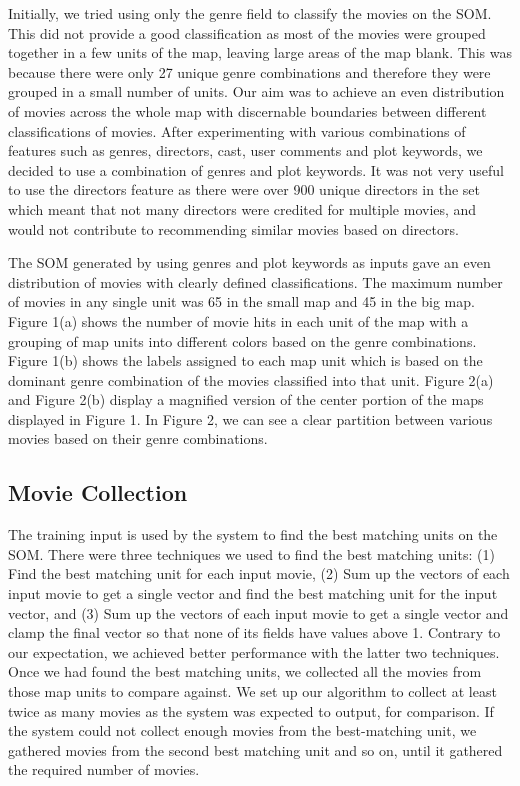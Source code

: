 \documentclass[conference]{IEEEtran}
\begin{document}
Initially, we tried using only the genre field to classify the movies on the SOM. This did not provide a good classification as most of the movies were grouped together in a few units of the map, leaving large areas of the map blank. This was because there were only 27 unique genre combinations and therefore they were grouped in a small number of units. Our aim was to achieve an even distribution of movies across the whole map with discernable boundaries between different classifications of movies. After experimenting with various combinations of features such as genres, directors, cast, user comments and plot keywords, we decided to use a combination of genres and plot keywords. It was not very useful to use the directors feature as there were over 900 unique directors in the set which meant that not many directors were credited for multiple movies, and would not contribute to recommending similar movies based on directors. 

The SOM generated by using genres and plot keywords as inputs gave an even distribution of movies with clearly defined classifications. The maximum number of movies in any single unit was 65 in the small map and 45 in the big map. Figure 1(a) shows the number of movie hits in each unit of the map with a grouping of map units into different colors based on the genre combinations. Figure 1(b) shows the labels assigned to each map unit which is based on the dominant genre combination of the movies classified into that unit. Figure 2(a) and Figure 2(b) display a magnified version of the center portion of the maps displayed in Figure 1. In Figure 2, we can see a clear partition between various movies based on their genre combinations.

\subsection{Movie Collection}

The training input is used by the system to find the best matching units on the SOM. There were three techniques we used to find the best matching units: (1) Find the best matching unit for each input movie, (2) Sum up the vectors of each input movie to get a single vector and find the best matching unit for the input vector, and (3) Sum up the vectors of each input movie to get a single vector and clamp the final vector so that none of its fields have values above 1. Contrary to our expectation, we achieved better performance with the latter two techniques. Once we had found the best matching units, we collected all the movies from those map units to compare against. We set up our algorithm to collect at least twice as many movies as the system was expected to output, for comparison. If the system could not collect enough movies from the best-matching unit, we gathered movies from the second best matching unit and so on, until it gathered the required number of movies.
\end{document}
